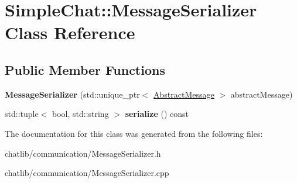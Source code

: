 \hypertarget{classSimpleChat_1_1MessageSerializer}{\section{Simple\-Chat\-:\-:Message\-Serializer Class Reference}
\label{classSimpleChat_1_1MessageSerializer}
}
\subsection*{Public Member Functions}
\begin{DoxyCompactItemize}
\item 
\hypertarget{classSimpleChat_1_1MessageSerializer_afc0d059f71d111bad3c0dc920aa49e5e}{{\bfseries Message\-Serializer} (std\-::unique\-\_\-ptr$<$ \hyperlink{classSimpleChat_1_1AbstractMessage}{Abstract\-Message} $>$ abstract\-Message)}\label{classSimpleChat_1_1MessageSerializer_afc0d059f71d111bad3c0dc920aa49e5e}

\item 
\hypertarget{classSimpleChat_1_1MessageSerializer_a35bbc3e823fee9942a67fd8450e253a9}{std\-::tuple$<$ bool, std\-::string $>$ {\bfseries serialize} () const }\label{classSimpleChat_1_1MessageSerializer_a35bbc3e823fee9942a67fd8450e253a9}

\end{DoxyCompactItemize}


The documentation for this class was generated from the following files\-:\begin{DoxyCompactItemize}
\item 
chatlib/communication/Message\-Serializer.\-h\item 
chatlib/communication/Message\-Serializer.\-cpp\end{DoxyCompactItemize}
